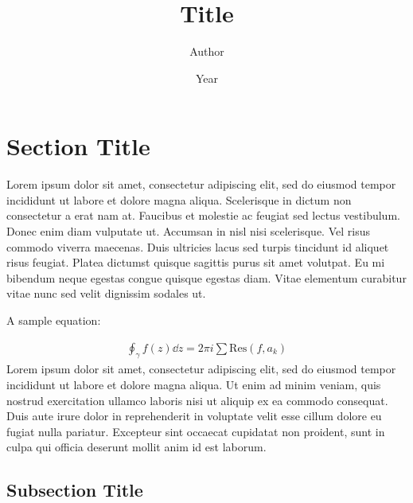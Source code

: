 \documentclass[10pt,letterpaper]{article}
\begin{document}
\title{\textbf{Title}}
\author[1]{Author}
\date{\fontsize{10}{10}\selectfont Year}

\begin{titlepage}
  \maketitle
  \thispagestyle{empty}
\end{titlepage}

\fancyhead[C]{\nouppercase{\leftmark}}
\setcounter{page}{1}
\cfoot{\thepage}

\section{Section Title}
\setcounter{equation}{0}

Lorem ipsum dolor sit amet, consectetur adipiscing elit, sed do eiusmod tempor incididunt ut labore et dolore magna aliqua. Scelerisque in dictum non consectetur a erat nam at. Faucibus et molestie ac feugiat sed lectus vestibulum. Donec enim diam vulputate ut. Accumsan in nisl nisi scelerisque. Vel risus commodo viverra maecenas. Duis ultricies lacus sed turpis tincidunt id aliquet risus feugiat. Platea dictumst quisque sagittis purus sit amet volutpat. Eu mi bibendum neque egestas congue quisque egestas diam. Vitae elementum curabitur vitae nunc sed velit dignissim sodales ut.\autocite[Lorem ipsum...]{latex-template}

A sample equation:

\begin{align}
  \oint_\gamma f(z)\dd{z} = 2\pi i\sum\text{Res}(f, a_k)
\end{align}
Lorem ipsum dolor sit amet, consectetur adipiscing elit, sed do eiusmod tempor incididunt ut labore et dolore magna aliqua. Ut enim ad minim veniam, quis nostrud exercitation ullamco laboris nisi ut aliquip ex ea commodo consequat. Duis aute irure dolor in reprehenderit in voluptate velit esse cillum dolore eu fugiat nulla pariatur. Excepteur sint occaecat cupidatat non proident, sunt in culpa qui officia deserunt mollit anim id est laborum.

\subsection{Subsection Title}
\end{document}
